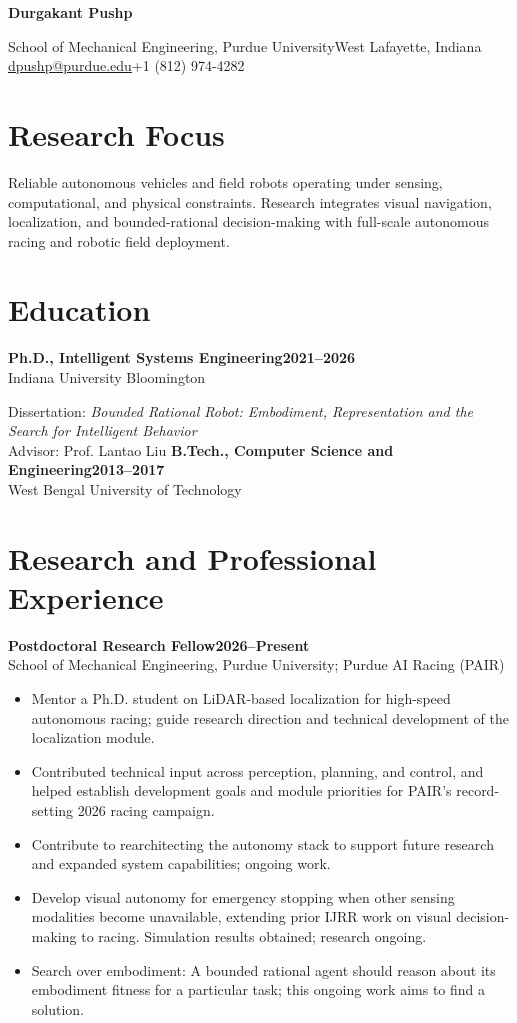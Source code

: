 \documentclass[11pt,letterpaper]{article}
\newcommand{\entry}[3]{\Needspace{4\baselineskip}\textbf{#1}\hfill\textbf{#2}\\#3\par}
\begin{document}
{\LARGE\bfseries Durgakant Pushp}\par
School of Mechanical Engineering, Purdue University\hfill West Lafayette, Indiana\\
\href{mailto:dpushp@purdue.edu}{dpushp@purdue.edu}\hfill +1 (812) 974-4282

\section{Research Focus}
Reliable autonomous vehicles and field robots operating under sensing, computational, and physical constraints. Research integrates visual navigation, localization, and bounded-rational decision-making with full-scale autonomous racing and robotic field deployment.

\section{Education}
\entry{Ph.D., Intelligent Systems Engineering}{2021--2026}{Indiana University Bloomington}
Dissertation: \emph{Bounded Rational Robot: Embodiment, Representation and the Search for Intelligent Behavior}\\
Advisor: Prof. Lantao Liu
\entry{B.Tech., Computer Science and Engineering}{2013--2017}{West Bengal University of Technology}

\section{Research and Professional Experience}
\entry{Postdoctoral Research Fellow}{2026--Present}{School of Mechanical Engineering, Purdue University; Purdue AI Racing (PAIR)}
\begin{itemize}
\item Mentor a Ph.D. student on LiDAR-based localization for high-speed autonomous racing; guide research direction and technical development of the localization module.
\item Contributed technical input across perception, planning, and control, and helped establish development goals and module priorities for PAIR's record-setting 2026 racing campaign.
\item Contribute to rearchitecting the autonomy stack to support future research and expanded system capabilities; ongoing work.
\item Develop visual autonomy for emergency stopping when other sensing modalities become unavailable, extending prior IJRR work on visual decision-making to racing. Simulation results obtained; research ongoing.
\item Search over embodiment: A bounded rational agent should reason about its embodiment fitness for a particular task; this ongoing work aims to find a solution. 
\end{itemize}
\end{document}
